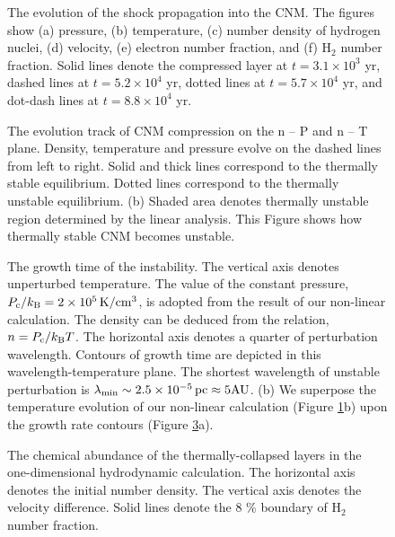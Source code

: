 \begin{figure}[htbp]


\caption{The evolution of the shock propagation into the CNM.
The figures show (a) pressure, (b) temperature, 
(c) number density of hydrogen nuclei,
(d) velocity, (e) electron number fraction,
and (f) H$_2$ number fraction.
Solid lines denote the compressed layer at $t=3.1\times 10^3$ yr,
dashed lines at $t=5.2\times 10^4$ yr, 
dotted lines at $t=5.7\times 10^4$ yr, 
and dot-dash lines at $t=8.8\times 10^4$ yr.}
\label{fig:CNM Layer}
\end{figure}

\begin{figure}[htbp]
\caption{The evolution track of CNM compression on the n -- P and n -- T plane.
Density, temperature and pressure evolve on the dashed lines 
from left to right.
Solid and thick lines correspond to the thermally stable equilibrium. 
Dotted lines correspond to the thermally unstable equilibrium. 
(b) Shaded area denotes 
thermally unstable region determined by the linear analysis.
This Figure shows how thermally stable CNM becomes unstable.}
\label{fig:n-Pc,n-Tc}
\end{figure}

\begin{figure}[htbp]
\caption{The growth time of the instability.
The vertical axis denotes unperturbed temperature.
The value of the constant pressure, 
$P_{\rm c}/k_{\rm B}=2 \times 10^5 \,{\rm K/cm^3}$,
is adopted from the result of our non-linear calculation.
The density can be deduced from the relation, $n=P_{\rm c}/k_{\rm B}T$.
The horizontal axis denotes a quarter of perturbation wavelength.
Contours of growth time are depicted in this wavelength-temperature plane.
The shortest wavelength of unstable perturbation is 
$\lambda_{\rm min}\sim 2.5 \times 10^{-5}\, {\rm pc}\approx 5 {\rm AU}$.
(b) We superpose the temperature evolution of our non-linear calculation 
(Figure \protect\ref{fig:CNM Layer}b)       
upon the growth rate contours (Figure \protect\ref{fig:growth46}a). }
\label{fig:growth46}
\end{figure}

\begin{figure}[htbp]
\caption{
The chemical abundance of the thermally-collapsed layers
in the one-dimensional hydrodynamic calculation.
The horizontal axis denotes the initial number density.
The vertical axis denotes the velocity difference.
Solid lines denote the 8 \% boundary of H$_2$ number fraction.}  
\label{fig:chemical abundance}
\end{figure}


